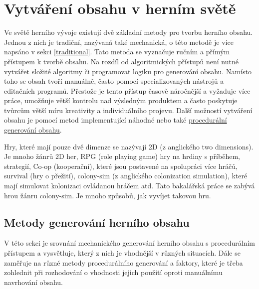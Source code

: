 \chapter{Vytváření obsahu v herním světě} 
\label{theory}
Ve světě herního vývoje existují dvě základní metody pro tvorbu herního obsahu. Jednou z nich je tradiční, nazývaná také mechanická, o této metodě je více napsáno v sekci \ref{traditional}. Tato metoda se vyznačuje ručním a přímým přístupem k tvorbě obsahu. Na rozdíl od algoritmických přístupů není nutné vytvářet složité algoritmy či programovat logiku pro generování obsahu. Namísto toho se obsah tvoří manuálně, často pomocí specializovaných nástrojů a editačních programů. Přestože je tento přístup časově náročnější a vyžaduje více práce, umožňuje větší kontrolu nad výsledným produktem a často poskytuje tvůrcům větší míru kreativity a individuálního projevu. Další možností vytváření obsahu je pomocí metod implementující náhodné nebo také \hyperref[procedural]{procedurální generování obsahu}. 

Hry, které mají pouze dvě dimenze se nazývají 2D (z anglického two dimensions). Je mnoho žánrů 2D her, RPG (role playing game) hry na hrdiny s příběhem, strategií, Co-op (kooperační), které jsou postavené na spolupráci více hráčů, survival (hry o přežití), colony-sim (z anglického colonization simulation), které mají simulovat kolonizaci ovládanou hráčem atd. Tato bakalářská práce se zabývá hrou žánru colony-sim. Je mnoho způsobů, jak vyvíjet takovou hru.


\section{Metody generování herního obsahu}

V této sekci je srovnání mechanického generování herního obsahu s procedurálním přístupem a vysvětluje, který z nich je vhodnější v různých situacích. Dále se zaměřuje na různé metody procedurálního generování a faktory, které je třeba zohlednit při rozhodování o vhodnosti jejich použití oproti manuálnímu navrhování obsahu.

